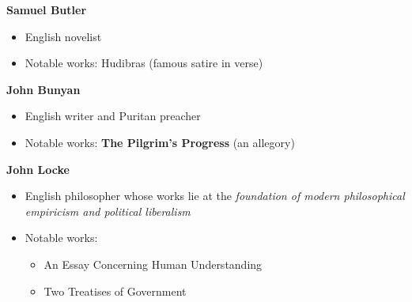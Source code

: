 \documentclass[
  12pt,
    progressbar=frametitle]{beamer}
\providecommand{\tightlist}{%
  \setlength{\itemsep}{0pt}\setlength{\parskip}{0pt}}
\begin{document}
\begin{frame}[allowframebreaks]
\vspace{15mm}
\large\textbf{Samuel Butler}\normalsize\vspace{-3mm}

\begin{itemize}
\tightlist
\item
  English novelist
\item
  Notable works: Hudibras (famous satire in verse)
\end{itemize}

\large\textbf{John Bunyan}\normalsize\vspace{-3mm}

\begin{itemize}
\tightlist
\item
  English writer and Puritan preacher
\item
  Notable works: \textbf{The Pilgrim's Progress} (an allegory)
\end{itemize}

\large\textbf{John Locke}\normalsize\vspace{-3mm}

\begin{itemize}
\tightlist
\item
  English philosopher whose works lie at the \emph{foundation of modern
  philosophical empiricism and political liberalism}
\item
  Notable works:

  \begin{itemize}
  \tightlist
  \item
    An Essay Concerning Human Understanding
  \item
    Two Treatises of Government
  \end{itemize}
\end{itemize}
\end{frame}
\end{document}
